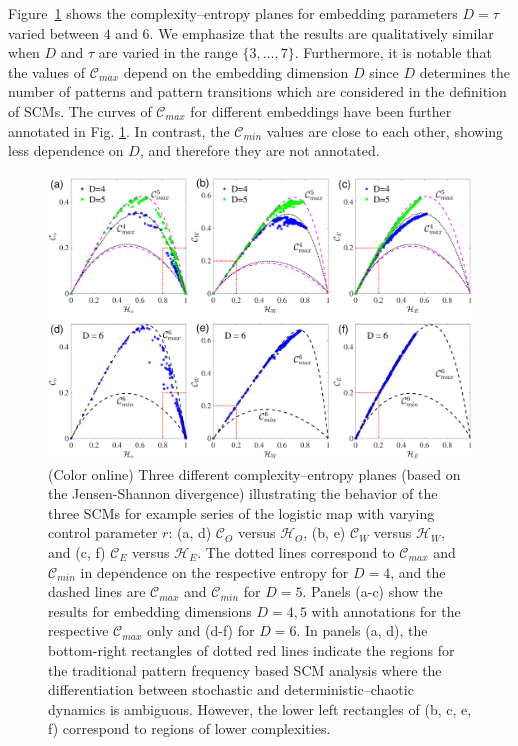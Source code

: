 \documentclass[aip,cha,reprint,nofootinbib]{revtex4-1}
\begin{document}
Figure~\ref{fig:CElogistic} shows the complexity--entropy planes for embedding parameters $D = \tau$ varied between $4$ and $6$. We emphasize that the results are qualitatively similar when $D$ and $\tau$ are varied in the range $\{3,\ldots, 7\}$. Furthermore, it is notable that the values of $\mathcal{C}_{max}$ depend on the embedding dimension $D$ since $D$ determines the number of patterns and pattern transitions which are considered in the definition of SCMs. {\color{red}The curves of $\mathcal{C}_{max}$ for different embeddings have been further annotated in Fig. \ref{fig:CElogistic}. In contrast, the $\mathcal{C}_{min}$ values are close to each other, showing less dependence on $D$, and therefore they are not annotated. }
\begin{figure}
	\centering 
	\includegraphics[width=2\columnwidth]{CompEntropy_LogisticHC.pdf}
\caption{\small{(Color online) Three different complexity--entropy planes (based on the Jensen-Shannon divergence) illustrating the behavior of the three SCMs for example series of the logistic map with varying control parameter $r$: (a, d) $\mathcal{C}_O$ versus $\mathcal{H}_O$, (b, e) $\mathcal{C}_{W}$ versus $\mathcal{H}_{W}$, and (c, f) $\mathcal{C}_{E}$ versus $\mathcal{H}_{E}$. The {\color{red} dotted lines correspond to $\mathcal{C}_{max}$ and $\mathcal{C}_{min}$ in dependence on the respective entropy for $D=4$, and the dashed lines are $\mathcal{C}_{max}$ and $\mathcal{C}_{min}$ for $D=5$. Panels (a-c) show the results for embedding dimensions $D = 4,5$ with annotations for the respective $\mathcal{C}_{max}$ only} and (d-f) for $D = 6$. In panels (a, d), the bottom-right rectangles of dotted red lines indicate the regions for the traditional pattern frequency based SCM analysis where the differentiation between stochastic and deterministic--chaotic dynamics is ambiguous. However, the lower left rectangles of (b, c, e, f) correspond to regions of lower complexities. }  \label{fig:CElogistic}}
\end{figure}
\end{document}
